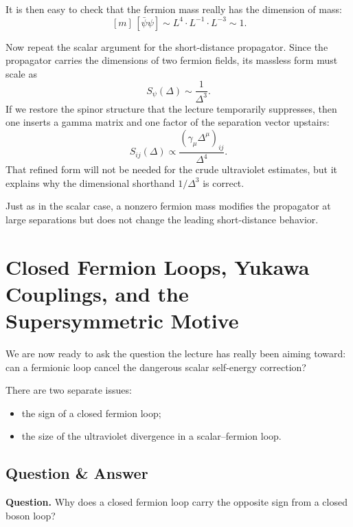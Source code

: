 It is then easy to check that the fermion mass really has the dimension of mass:
\begin{equation}
[d^4x]\,[m]\,[\bar\psi\psi]
\sim L^4 \cdot L^{-1} \cdot L^{-3} \sim 1.
\end{equation}

Now repeat the scalar argument for the short-distance propagator. Since the propagator carries the dimensions of two fermion fields, its massless form must scale as
\begin{equation}
S_\psi(\Delta) \sim \frac{1}{\Delta^3}.
\end{equation}
If we restore the spinor structure that the lecture temporarily suppresses, then one inserts a gamma matrix and one factor of the separation vector upstairs:
\begin{equation}
S_{ij}(\Delta) \propto \frac{(\gamma_\mu \Delta^\mu)_{ij}}{\Delta^4}.
\end{equation}
That refined form will not be needed for the crude ultraviolet estimates, but it explains why the dimensional shorthand \(1/\Delta^3\) is correct.

Just as in the scalar case, a nonzero fermion mass modifies the propagator at large separations but does not change the leading short-distance behavior.

\section{Closed Fermion Loops, Yukawa Couplings, and the Supersymmetric Motive}

We are now ready to ask the question the lecture has really been aiming toward: can a fermionic loop cancel the dangerous scalar self-energy correction?

There are two separate issues:
\begin{itemize}
\item the sign of a closed fermion loop;
\item the size of the ultraviolet divergence in a scalar--fermion loop.
\end{itemize}

\subsection{Question \& Answer}

\textbf{Question.} Why does a closed fermion loop carry the opposite sign from a closed boson loop?


